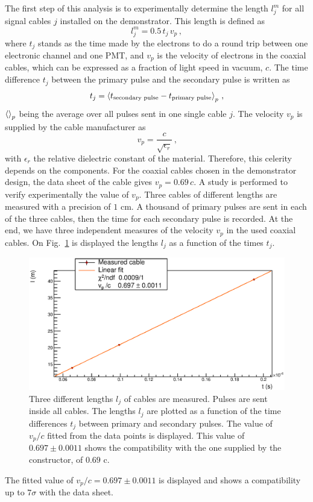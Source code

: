 The first step of this analysis is to experimentally determine the length $l_{j}^{m}$ for all signal cables $j$ installed on the demonstrator.
This length is defined as
\begin{equation}
  l_{j}^{m}= 0.5\,t_{j}\,v_{p}\, ,
\end{equation}
where $t_{j}$ stands as the time made by the electrons to do a round trip between one electronic channel and one PMT, and $v_{p}$ is the velocity of electrons in the coaxial cables, which can be expressed as a fraction of light speed in vacuum, $c$.
The time difference $t_{j}$ between the primary pulse and the secondary pulse is written as
\begin{equation}
  t_{j} = \braket{t_{\text{secondary pulse}}-t_{\text{primary pulse}}}_{p} \, \text{,}
\end{equation}
$\braket{}_{p}$ being the average over all pulses sent in one single cable $j$.
The velocity $v_{p}$ is supplied by the cable manufacturer as
\begin{equation*}
  v_{p}=\frac{c}{\sqrt{\epsilon_{r}}}\,\text{,}
\end{equation*}
with $\epsilon_{r}$ the relative dielectric constant of the material.
Therefore, this celerity depends on the components.
For the coaxial cables chosen in the demonstrator design, the data sheet of the cable gives ${v_{p}=0.69\,c}$.
A study is performed to verify experimentally the value of $v_{p}$.
Three cables of different lengths are measured with a precision of $1$ cm.
A thousand of primary pulses are sent in each of the three cables, then the time for each secondary pulse is recorded.
At the end, we have three independent measures of the velocity $v_{p}$ in the used coaxial cables.
On Fig.~\ref{fig:celerity} is displayed the lengths $l_{j}$ as a function of the times $t_{j}$.
\begin{figure}[h]
  \centering
  \includegraphics[width=15cm]{commissioning/fig_commissioning/celerity.eps}
  \caption{Three different lengths $l_{j}$ of cables are measured.
    Pulses are sent inside all cables.
    The lengths $l_{j}$ are plotted as a function of the time differences $t_{j}$ between primary and secondary pulses.
    The value of $v_{p}/c$ fitted from the data points is displayed.
    This value of $0.697\pm 0.0011$ shows the compatibility with the one supplied by the constructor, of $0.69$ c.
    \label{fig:celerity}}
\end{figure}
The fitted value of $v_{p}/c = 0.697\pm 0.0011$ is displayed and shows a compatibility up to $7\sigma$ with the data sheet.

